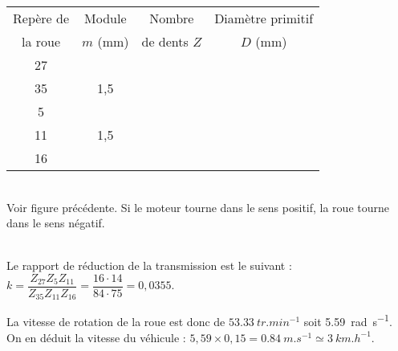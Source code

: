 \normalsize

\else
\footnotesize
\begin{marginfigure}
\begin{tabular}{|c|c|c|c|}
\hline
Repère de  & Module  & Nombre & Diamètre primitif  \\
la roue & $m$ (mm) & de dents $Z$ & $D$ (mm) \\
\hline
\hline
27 & & & \\ \hline
35 & 1,5& & \\ \hline
5& & & \\ \hline
11& 1,5 & & \\ \hline
16& & & \\ \hline

\end{tabular}
\end{marginfigure}

\normalsize
\fi


\ifprof ~\\
Voir figure précédente. Si le moteur tourne dans le sens positif, la roue tourne dans le sens négatif. 
\else
\fi

\ifprof ~\\
Le rapport de réduction de la transmission est le suivant : 
$k=\dfrac{Z_{27} Z_{5} Z_{11} }{Z_{35} Z_{11} Z_{16}} = \dfrac{16\cdot 14}{84\cdot 75} =0,0355 $.

La vitesse de rotation de la roue est donc de $\SI{53,33}{tr.min^{-1}}$ soit \SI{5,59}{rad.s^{-1}}. 
On en déduit la vitesse du véhicule : $5,59 \times 0,15 = \SI{0,84}{m.s^{-1}}\simeq \SI{3}{km.h^{-1}}$.

\else
\fi

\ifprof
\else


\fi